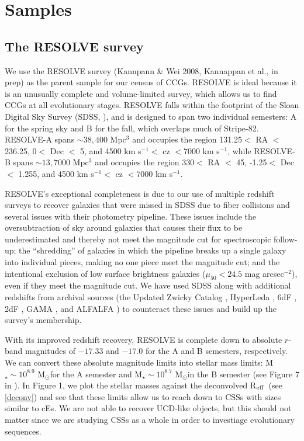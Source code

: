 \documentclass[iop,apj]{emulateapj}
\newcommand{\Reff}{R$_{\rm eff}$}
\newcommand{\Msun}{M$_{\odot}$}
\begin{document}
\section{Samples}
\label{samples}

\subsection{The RESOLVE survey}
\label{resolve}

\noindent We use the RESOLVE survey (Kannpann \& Wei 2008, Kannappan et al., in prep) as the parent sample for our census of CCGs. RESOLVE is ideal because it is an unusually complete and volume-limited survey, which allows us to find CCGs at all evolutionary stages. RESOLVE falls within the footprint of the Sloan Digital Sky Survey (SDSS, \citet{York2000}), and is designed to span two individual semesters: A for the spring sky and B for the fall, which overlaps much of Stripe-82. RESOLVE-A spans $\sim38,400$ Mpc$^3$ and occupies the region 131.25\textdegree $<$ RA $<$ 236.25\textdegree, 0\textdegree $<$ Dec $<$ 5\textdegree, and 4500 km s$^{-1} <$ cz $< 7000$ km s$^{-1}$, while RESOLVE-B spans $\sim13,7000 $ Mpc$^3$ and occupies the region 330\textdegree $<$ RA $<$ 45\textdegree, -1.25\textdegree $<$ Dec $<$ 1.255\textdegree, and 4500 km s$^{-1} <$ cz $< 7000$ km s$^{-1}$.

RESOLVE's exceptional completeness is due to our use of multiple redshift surveys to recover galaxies that were missed in SDSS due to fiber collisions and several issues with their photometry pipeline. These issues include the oversubtraction of sky around galaxies that causes their flux to be underestimated and thereby not meet the magnitude cut for spectroscopic follow-up; the ``shredding'' of galaxies in which the pipeline breaks up a single galaxy into individual pieces, making no one piece meet the magnitude cut; and the intentional exclusion of low surface brightness galaxies ($\mu_{50} < 24.5$ mag arcsec$^{-2}$), even if they meet the magnitude cut. We have used SDSS along with additional redshifts from archival sources (the Updated Zwicky Catalog \citep{Falco1999}, HyperLeda \citep{Paturel2003}, 6dF \citep{Jones2009}, 2dF \citep{Colless2001}, GAMA \citep{Driver2011}, and ALFALFA \citep{Haynes2011}) to counteract these issues and build up the survey's membership.

With its improved redshift recovery, RESOLVE is complete down to absolute $r$-band magnitudes of $-17.33$ and $-17.0$ for the A and B semesters, respectively. We can convert these absolute magnitude limits into stellar mass limits: M$_{\star} \sim 10^{8.9}$ \Msun for the A semester and M$_{\star} \sim 10^{8.7}$ \Msun in the B semester (see Figure 7 in \citet{Eckert2016}). In Figure 1, we plot the stellar masses against the deconvolved \Reff\ (see \autoref{deconv}) and see that these limits allow us to reach down to CSSs with sizes similar to cEs. We are not able to recover UCD-like objects, but this should not matter since we are studying CSSs as a whole in order to investiage evolutionary sequences.
\end{document}
